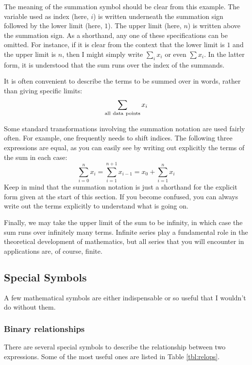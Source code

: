 The meaning of the summation symbol should be clear from this example.
The variable used as index (here, $i$) is written underneath the
summation sign followed by the lower limit (here, $1$).  The upper
limit (here, $n$) is written above the summation sign.  As a
shorthand, any one of these specifications can be omitted. For
instance, if it is clear from the context that the lower limit is $1$
and the upper limit is $n$, then I might simply write $\sum_i x_i$ or
even $\sum x_i$. In the latter form, it is understood that the sum runs
over the index of the summands.

It is often convenient to describe the terms to be summed over in
words, rather than giving specific limits:
%
\[
\sum_{\rm{all\  data\  points}} x_i
\]
%

Some standard transformations involving the summation notation are
used fairly often. For example, one frequently needs to shift indices.
The following three expressions are equal, as you can easily see by
writing out explicitly the terms of the sum in each case:
%
\[
\sum_{i=0}^n x_i = \sum_{i=1}^{n+1} x_{i-1} = x_0 + \sum_{i=1}^n x_i
\]
%
Keep in mind that the summation notation is just a shorthand for
the explicit form given at the start of this section. If you become
confused, you can always write out the terms explicitly to understand
what is going on.

Finally, we may take the upper limit of the sum to be infinity, in
which case the sum runs over infinitely many terms. Infinite series
play a fundamental role in the theoretical development of mathematics,
but all series that you will encounter in applications are, of course,
finite.

\subsection{Special Symbols}


A few mathematical symbols are either indispensable or so useful that
I wouldn't do without them.

\subsubsection{Binary relationships}

 
There are several special symbols to describe the relationship between
two expressions. Some of the most useful ones are listed in Table
\ref{tbl:relops}.

